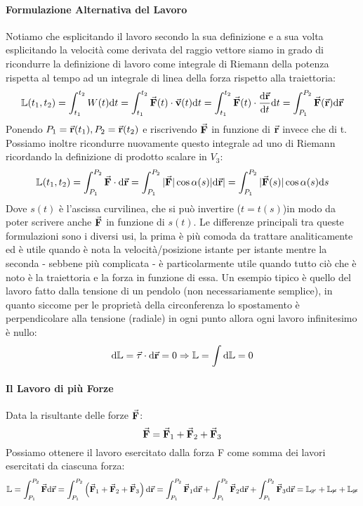\documentclass{article}
\newcommand{\then}{\ensuremath{\Rightarrow}}
\renewcommand{\v}{\va{v}}
\renewcommand{\r}{\va{r}}
\newcommand{\tauvt}{\va{\tau}}
\newcommand{\F}{\va{F}}
\begin{document}
\paragraph{Formulazione Alternativa del Lavoro}
Notiamo che esplicitando il lavoro secondo la sua definizione e a sua volta esplicitando la velocità come derivata del raggio vettore siamo in grado di ricondurre la definizione di lavoro come integrale di Riemann della potenza rispetta al tempo ad un integrale di linea della forza rispetto alla traiettoria:
\[\mathbb{L}(t_1,t_2)=\int_{t_1}^{t_2}W(t)\dd t=\int_{t_1}^{t_2}\F(t)\cdot\v(t)\dd t=\int_{t_1}^{t_2}\F(t)\cdot\dv{\r}{t}\dd t=\int_{P_1}^{P_2}\F(\r)\dd\r\]
Ponendo $P_1=\r(t_1),P_2=\r(t_2)$ e riscrivendo $\F$ in funzione di $\r$ invece che di t.
Possiamo inoltre ricondurre nuovamente questo integrale ad uno di Riemann ricordando la definizione di prodotto scalare in $V_3$:
\[\mathbb{L}(t_1,t_2)=\int_{P_1}^{P_2}\F\cdot\dd\r=\int_{P_1}^{P_2}|\F|\cos\alpha(s)|\dd \r|=\int_{P_1}^{P_2}|\F(s)|\cos\alpha(s)\dd s\]
Dove $s(t)$ è l'ascissa curvilinea, che si può invertire ($t=t(s)$)in modo da poter scrivere anche $\F$ in funzione di $s(t)$.
Le differenze principali tra queste formulazioni sono i diversi usi, la prima è più comoda da trattare analiticamente ed è utile quando è nota la velocità/posizione istante per istante mentre la seconda - sebbene più complicata - è particolarmente utile quando tutto ciò che è noto è la traiettoria e la forza in funzione di essa. Un esempio tipico è quello del lavoro fatto dalla tensione di un pendolo (non necessariamente semplice), in quanto siccome per le proprietà della circonferenza lo spostamento è perpendicolare alla tensione (radiale) in ogni punto allora ogni lavoro infinitesimo è nullo:
\[\dd\mathbb{L}=\tauvt\cdot\dd\r=0\then \mathbb{L}=\int\dd\mathbb{L}=0\]
\paragraph{Il Lavoro di più Forze}
Data la risultante delle forze $\F$:
\[\F=\F_1+\F_2+\F_3\]
Possiamo ottenere il lavoro esercitato dalla forza F come somma dei lavori esercitati da ciascuna forza:
\[\mathbb{L}=\int_{P_1}^{P_2}\F\dd\r=\int_{P_1}^{P_2}\left(\F_1+\F_2+\F_3\right)\dd\r=\int_{P_1}^{P_2}\F_1\dd\r+\int_{P_1}^{P_2}\F_2\dd\r+\int_{P_1}^{P_2}\F_3\dd\r=\mathbb{L_1}+\mathbb{L_2}+\mathbb{L_3}\]
\end{document}
